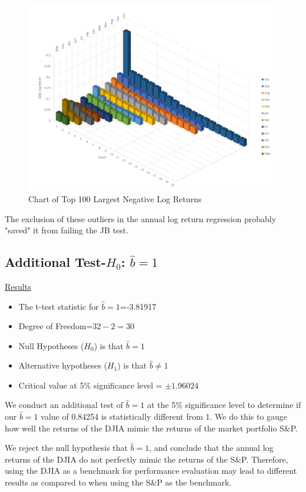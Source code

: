 \documentclass[a4paper]{article}
\begin{document}
	\newpage
	\begin{figure}[ht]
		\centering
		\includegraphics[width=\linewidth, frame]{worstdays.png}
		\captionsetup{font=small}
		\caption{Chart of Top 100 Largest Negative Log Returns}
	\end{figure}
	
	The exclusion of these outliers in the annual log return regression probably "saved" it from failing the JB test. 
	
	\subsection{Additional Test-$H_0$: $\hat{b}=1$}
	\underline{Results}
	\begin{itemize}[nosep]
		\item The t-test statistic for $\hat{b}=1$=-3.81917
		\item Degree of Freedom=$32 - 2 = 30$
		\item Null Hypotheses ($H_0$) is that $\hat{b}=1$
		\item Alternative hypotheses ($H_1$) is that $\hat{b} \ne 1$
		\item Critical value at 5\% significance level = $\pm 1.96024$
	\end{itemize}
	
	We conduct an additional test of $\hat{b}=1$ at the 5\% significance level to determine if our $\hat{b}=1$ value of 0.84254 is statistically different from 1. We do this to gauge how well the returns of the DJIA mimic the returns of the market portfolio S\&P. 
	
	We reject the null hypothesis that $\hat{b}=1$, and conclude that the annual log returns of the DJIA do not perfectly mimic the returns of the S\&P. Therefore, using the DJIA as a benchmark for performance evaluation may lead to different results as compared to when using the S\&P as the benchmark. 
	
\end{document}
